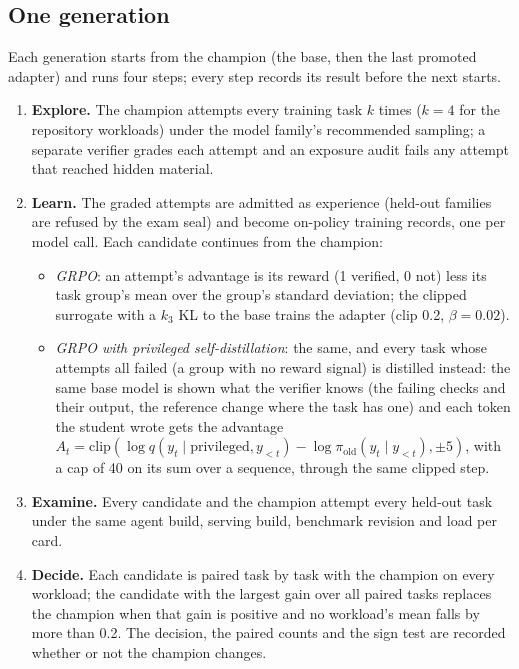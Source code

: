 \subsection{One generation}

Each generation starts from the champion (the base, then the last promoted adapter) and runs four
steps; every step records its result before the next starts.
\begin{enumerate}
\item \textbf{Explore.} The champion attempts every training task $k$ times ($k=4$ for the
  repository workloads) under the model family's recommended sampling; a separate verifier grades
  each attempt and an exposure audit fails any attempt that reached hidden material.
\item \textbf{Learn.} The graded attempts are admitted as experience (held-out families are
  refused by the exam seal) and become on-policy training records, one per model call. Each
  candidate continues from the champion:
  \begin{itemize}
  \item \emph{GRPO}: an attempt's advantage is its reward (1 verified, 0 not) less its task
    group's mean over the group's standard deviation; the clipped surrogate with a $k_3$ KL to the
    base trains the adapter (clip 0.2, $\beta=0.02$).
  \item \emph{GRPO with privileged self-distillation}: the same, and every task whose attempts all
    failed (a group with no reward signal) is distilled instead: the same base model is shown what
    the verifier knows (the failing checks and their output, the reference change where the task
    has one) and each token the student wrote gets the advantage
    $A_t=\mathrm{clip}(\log q(y_t\mid\text{privileged},y_{<t})-\log\pi_{\text{old}}(y_t\mid y_{<t}),\pm 5)$,
    with a cap of 40 on its sum over a sequence, through the same clipped step.
  \end{itemize}
\item \textbf{Examine.} Every candidate and the champion attempt every held-out task under the
  same agent build, serving build, benchmark revision and load per card.
\item \textbf{Decide.} Each candidate is paired task by task with the champion on every workload;
  the candidate with the largest gain over all paired tasks replaces the champion when that gain is
  positive and no workload's mean falls by more than 0.2. The decision, the paired counts and the
  sign test are recorded whether or not the champion changes.
\end{enumerate}

